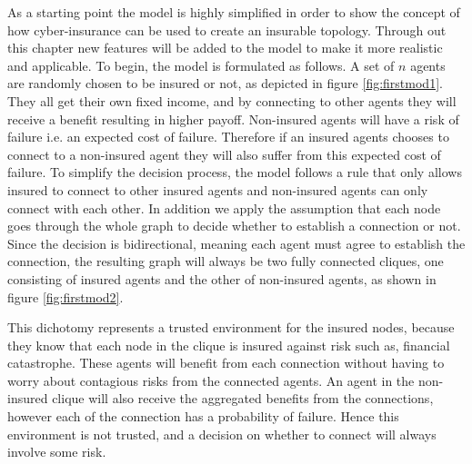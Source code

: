 As a starting point the model is highly simplified in order to show the concept of how cyber-insurance can be used to create an insurable topology. Through out this chapter new features will be added to the model to make it more realistic and applicable. To begin, the model is formulated as follows.
A set of $n$ agents are randomly chosen to be insured or not, as depicted in figure \ref{fig:firstmod1}. They all get their own fixed income, and by connecting to other agents they will receive a benefit resulting in higher payoff. Non-insured agents will have a risk of failure i.e. an expected cost of failure. Therefore if an insured agents chooses to connect to a non-insured agent they will also suffer from this expected cost of failure. To simplify the decision process, the model follows a rule that only allows insured to connect to other insured agents and non-insured agents can only connect with each other. In addition we apply the assumption that each node goes through the whole graph to decide whether to establish a connection or not. Since the decision is bidirectional, meaning each agent must agree to establish the connection, the resulting graph will always be two fully connected cliques, one consisting of insured agents and the other of non-insured agents, as shown in figure \ref{fig:firstmod2}. 


This dichotomy represents a trusted environment for the insured nodes, because they know that each node in the clique is insured against risk such as, financial catastrophe. These agents will benefit from each connection without having to worry about contagious risks from the connected agents. 
An agent in the non-insured clique will also receive the aggregated benefits from the connections, however each of the connection has a probability of failure. Hence this environment is not trusted, and a decision on whether to connect will always involve some risk. 

